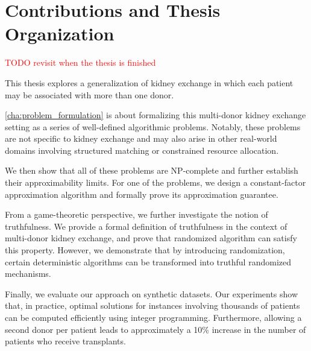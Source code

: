 \section{Contributions and Thesis Organization}

\textcolor{red}{TODO revisit when the thesis is finished}

This thesis explores a generalization of kidney exchange in which each patient may be associated with more than one donor.

\autoref{cha:problem_formulation} is about formalizing this multi-donor kidney exchange setting as a series of well-defined algorithmic problems. Notably, these problems are not specific to kidney exchange and may also arise in other real-world domains involving structured matching or constrained resource allocation.

We then show that all of these problems are NP-complete and further establish their approximability limits. For one of the problems, we design a constant-factor approximation algorithm and formally prove its approximation guarantee.

From a game-theoretic perspective, we further investigate the notion of truthfulness. We provide a formal definition of truthfulness in the context of multi-donor kidney exchange, and prove that randomized algorithm can satisfy this property. However, we demonstrate that by introducing randomization, certain deterministic algorithms can be transformed into truthful randomized mechanisms.

Finally, we evaluate our approach on synthetic datasets. Our experiments show that, in practice, optimal solutions for instances involving thousands of patients can be computed efficiently using integer programming. Furthermore, allowing a second donor per patient leads to approximately a 10\% increase in the number of patients who receive transplants.



